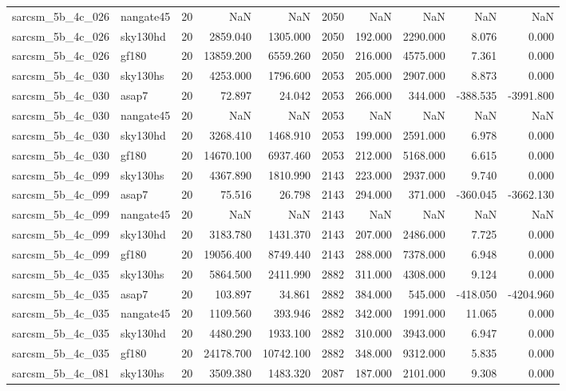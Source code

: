 \documentclass{article}
\begin{document}
\begin{longtable}{llrrrrrrrr}
sarcsm\_5b\_4c\_026 & nangate45 & 20 & NaN & NaN & 2050 & NaN & NaN & NaN & NaN \\
sarcsm\_5b\_4c\_026 & sky130hd & 20 & 2859.040 & 1305.000 & 2050 & 192.000 & 2290.000 & 8.076 & 0.000 \\
sarcsm\_5b\_4c\_026 & gf180 & 20 & 13859.200 & 6559.260 & 2050 & 216.000 & 4575.000 & 7.361 & 0.000 \\
sarcsm\_5b\_4c\_030 & sky130hs & 20 & 4253.000 & 1796.600 & 2053 & 205.000 & 2907.000 & 8.873 & 0.000 \\
sarcsm\_5b\_4c\_030 & asap7 & 20 & 72.897 & 24.042 & 2053 & 266.000 & 344.000 & -388.535 & -3991.800 \\
sarcsm\_5b\_4c\_030 & nangate45 & 20 & NaN & NaN & 2053 & NaN & NaN & NaN & NaN \\
sarcsm\_5b\_4c\_030 & sky130hd & 20 & 3268.410 & 1468.910 & 2053 & 199.000 & 2591.000 & 6.978 & 0.000 \\
sarcsm\_5b\_4c\_030 & gf180 & 20 & 14670.100 & 6937.460 & 2053 & 212.000 & 5168.000 & 6.615 & 0.000 \\
sarcsm\_5b\_4c\_099 & sky130hs & 20 & 4367.890 & 1810.990 & 2143 & 223.000 & 2937.000 & 9.740 & 0.000 \\
sarcsm\_5b\_4c\_099 & asap7 & 20 & 75.516 & 26.798 & 2143 & 294.000 & 371.000 & -360.045 & -3662.130 \\
sarcsm\_5b\_4c\_099 & nangate45 & 20 & NaN & NaN & 2143 & NaN & NaN & NaN & NaN \\
sarcsm\_5b\_4c\_099 & sky130hd & 20 & 3183.780 & 1431.370 & 2143 & 207.000 & 2486.000 & 7.725 & 0.000 \\
sarcsm\_5b\_4c\_099 & gf180 & 20 & 19056.400 & 8749.440 & 2143 & 288.000 & 7378.000 & 6.948 & 0.000 \\
sarcsm\_5b\_4c\_035 & sky130hs & 20 & 5864.500 & 2411.990 & 2882 & 311.000 & 4308.000 & 9.124 & 0.000 \\
sarcsm\_5b\_4c\_035 & asap7 & 20 & 103.897 & 34.861 & 2882 & 384.000 & 545.000 & -418.050 & -4204.960 \\
sarcsm\_5b\_4c\_035 & nangate45 & 20 & 1109.560 & 393.946 & 2882 & 342.000 & 1991.000 & 11.065 & 0.000 \\
sarcsm\_5b\_4c\_035 & sky130hd & 20 & 4480.290 & 1933.100 & 2882 & 310.000 & 3943.000 & 6.947 & 0.000 \\
sarcsm\_5b\_4c\_035 & gf180 & 20 & 24178.700 & 10742.100 & 2882 & 348.000 & 9312.000 & 5.835 & 0.000 \\
sarcsm\_5b\_4c\_081 & sky130hs & 20 & 3509.380 & 1483.320 & 2087 & 187.000 & 2101.000 & 9.308 & 0.000 \\

\end{longtable}
\end{document}
